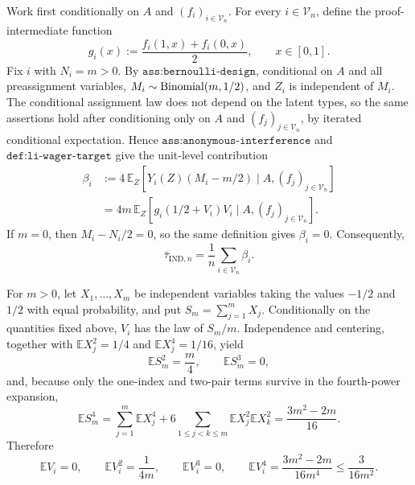 Work first conditionally on \(A\) and \((f_i)_{i\in\mathcal V_n}\).  For every \(i\in\mathcal V_n\), define the proof-intermediate function
\[
g_i(x):=\frac{f_i(1,x)+f_i(0,x)}{2},\qquad x\in[0,1].
\]
Fix \(i\) with \(N_i=m>0\).  By \(\texttt{ass:bernoulli-design}\), conditional on \(A\) and all preassignment variables, \(M_i\sim {\rm Binomial}(m,1/2)\), and \(Z_i\) is independent of \(M_i\).  The conditional assignment law does not depend on the latent types, so the same assertions hold after conditioning only on \(A\) and \((f_j)_{j\in\mathcal V_n}\), by iterated conditional expectation.  Hence \(\texttt{ass:anonymous-interference}\) and \(\texttt{def:li-wager-target}\) give the unit-level contribution
\[
\begin{aligned}
\beta_i
&:=4\,\mathbb E_Z\!\left[Y_i(Z)(M_i-m/2)\mid A,(f_j)_{j\in\mathcal V_n}\right]\\
&=4m\,\mathbb E_Z\!\left[g_i(1/2+V_i)V_i\mid A,(f_j)_{j\in\mathcal V_n}\right].
\end{aligned}
\]
If \(m=0\), then \(M_i-N_i/2=0\), so the same definition gives \(\beta_i=0\).  Consequently,
\[
\bar\tau_{\mathrm{IND},n}=\frac1n\sum_{i\in\mathcal V_n}\beta_i.
\]

For \(m>0\), let \(X_1,\ldots,X_m\) be independent variables taking the values \(-1/2\) and \(1/2\) with equal probability, and put \(S_m=\sum_{j=1}^mX_j\).  Conditionally on the quantities fixed above, \(V_i\) has the law of \(S_m/m\).  Independence and centering, together with \(\mathbb E X_j^2=1/4\) and \(\mathbb E X_j^4=1/16\), yield
\[
\mathbb E S_m^2=\frac m4,
\qquad
\mathbb E S_m^3=0,
\]
and, because only the one-index and two-pair terms survive in the fourth-power expansion,
\[
\mathbb E S_m^4
=\sum_{j=1}^m\mathbb E X_j^4
+6\sum_{1\le j<k\le m}\mathbb E X_j^2\mathbb E X_k^2
=\frac{3m^2-2m}{16}.
\]
Therefore
\[
\mathbb E V_i=0,
\qquad
\mathbb E V_i^2=\frac1{4m},
\qquad
\mathbb E V_i^3=0,
\qquad
\mathbb E V_i^4=\frac{3m^2-2m}{16m^4}\le\frac3{16m^2}.
\]

